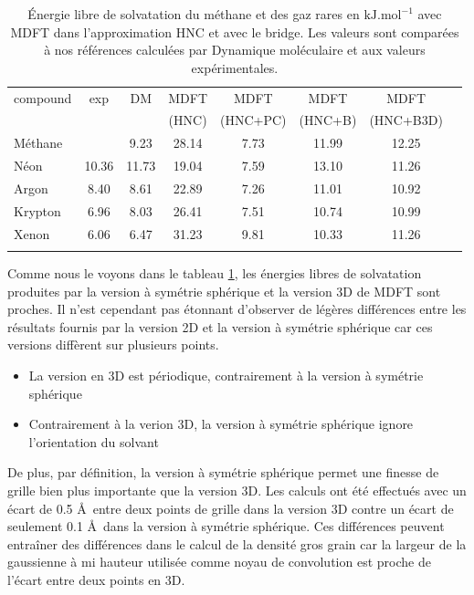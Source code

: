 \begin{table}[ht]
  \centering
  \begin{tabular}{ l c c c c c c c }
    \hline & \\[-1em]\hline
    compound   & exp  & DM & MDFT & MDFT & MDFT  & MDFT \\
               &      &    & (HNC)  & (HNC+PC)  & (HNC+B) & (HNC+B3D) \\
    \hline
    Méthane    &       &  9.23 & 28.14 & 7.73 & 11.99 & 12.25 \\
    Néon       & 10.36 & 11.73 & 19.04 & 7.59 & 13.10 & 11.26 \\
    Argon      &  8.40 &  8.61 & 22.89 & 7.26 & 11.01 & 10.92 \\
    Krypton    &  6.96 &  8.03 & 26.41 & 7.51 & 10.74 & 10.99 \\
    Xenon      &  6.06 &  6.47 & 31.23 & 9.81 & 10.33 & 11.26 \\
    \hline & \\[-1em]\hline
  \end{tabular}
  \caption[\'Energie libre de solvatation du méthane et des gaz rares.]{\'Energie libre de solvatation du méthane et des gaz rares en $\mathrm{kJ}.\mathrm{mol}^{-1}$ avec MDFT dans l'approximation HNC et avec le bridge. Les valeurs sont comparées à nos références calculées par Dynamique moléculaire et aux valeurs expérimentales\cite{straatsma_free_1986}.}
  \label{tab:deltag_1D_3D}  
\end{table}

Comme nous le voyons dans le tableau \ref{tab:deltag_1D_3D}, les énergies libres de solvatation produites par la version à symétrie sphérique et la version 3D de MDFT sont proches. Il n'est cependant pas étonnant d'observer de légères différences entre les résultats fournis par la version 2D et la version à symétrie sphérique car ces versions diffèrent sur plusieurs points. 

\begin{itemize}
\item La version en 3D est périodique, contrairement à la version à symétrie sphérique
\item Contrairement à la verion 3D, la version à symétrie sphérique ignore l'orientation du solvant
\end{itemize}

De plus, par définition, la version à symétrie sphérique permet une finesse de grille bien plus importante que la version 3D. Les calculs ont été effectués avec un écart de 0.5 \AA\ entre deux points de grille dans la version 3D contre un écart de seulement 0.1 \AA\ dans la version à symétrie sphérique. Ces différences peuvent entraîner des différences dans le calcul de la densité gros grain car la largeur de la gaussienne à mi hauteur utilisée comme noyau de convolution est proche de l'écart entre deux points en 3D.

